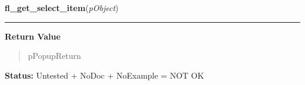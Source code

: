     \vspace{0.5ex}

\hspace{.8\funcindent}\begin{boxedminipage}{\funcwidth}

    \raggedright \textbf{fl\_get\_select\_item}(\textit{pObject})

    \vspace{-1.5ex}

    \rule{\textwidth}{0.5\fboxrule}
\setlength{\parskip}{2ex}
\setlength{\parskip}{1ex}
      \textbf{Return Value}
    \vspace{-1ex}

      \begin{quote}
      pPopupReturn

      \end{quote}

\textbf{Status:} Untested + NoDoc + NoExample = NOT OK



    \end{boxedminipage}

    \label{xformslib:library:fl_set_select_item}

    \vspace{0.5ex}

